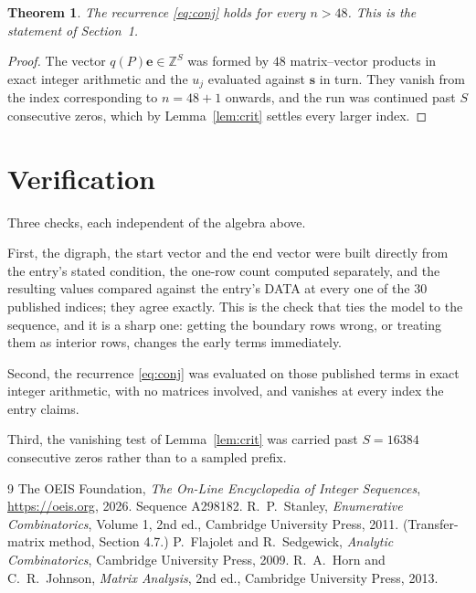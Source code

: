 \documentclass[11pt,a4paper]{article}
\theoremstyle{plain}
\newtheorem{theorem}{Theorem}
\theoremstyle{definition}
\begin{document}
\begin{theorem}
The recurrence \eqref{eq:conj} holds for every $n>48$. This is the statement of
Section~1.
\end{theorem}

\begin{proof}
The vector $q(P)\mathbf{e}\in\mathbb{Z}^{S}$ was formed by $48$ matrix--vector
products in exact integer arithmetic and the $u_j$ evaluated against $\mathbf{s}$ in turn.
They vanish from the index corresponding to $n=48+1$ onwards, and the run was continued
past $S$ consecutive zeros, which by Lemma~\ref{lem:crit} settles every larger index.
\end{proof}

\section{Verification}

Three checks, each independent of the algebra above.

First, the digraph, the start vector and the end vector were built directly from the
entry's stated condition, the one-row count computed separately, and the resulting values
compared against the entry's DATA at every one of the $30$ published indices; they
agree exactly. This is the check that ties the model to the sequence, and it is a sharp one:
getting the boundary rows wrong, or treating them as interior rows, changes the early terms
immediately.

Second, the recurrence \eqref{eq:conj} was evaluated on those published terms in exact
integer arithmetic, with no matrices involved, and vanishes at every index the entry claims.

Third, the vanishing test of Lemma~\ref{lem:crit} was carried past $S=16384$ consecutive
zeros rather than to a sampled prefix.

\begin{thebibliography}{9}
 The OEIS Foundation, \emph{The On-Line Encyclopedia of Integer
Sequences}, \url{https://oeis.org}, 2026. Sequence A298182.
 R.~P.~Stanley, \emph{Enumerative Combinatorics}, Volume 1, 2nd ed.,
Cambridge University Press, 2011. (Transfer-matrix method, Section 4.7.)
 P.~Flajolet and R.~Sedgewick, \emph{Analytic Combinatorics}, Cambridge
University Press, 2009.
 R.~A.~Horn and C.~R.~Johnson, \emph{Matrix Analysis}, 2nd ed., Cambridge
University Press, 2013.
\end{thebibliography}
\end{document}
